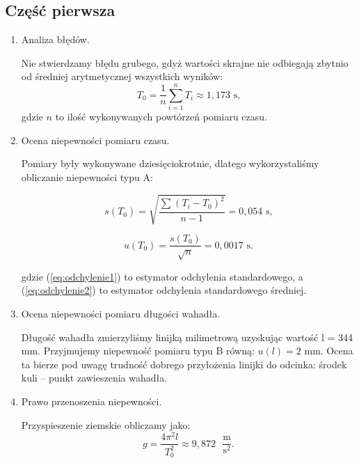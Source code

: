 \documentclass [a4paper,11pt]{article}
\begin{document}
	\subsection{Część pierwsza}\label{cz1}
	\begin{enumerate}[label=\alph*)]
		\item Analiza błędów.
		
		Nie stwierdzamy błędu grubego, gdyż wartości skrajne nie odbiegają zbytnio od średniej arytmetycznej wszystkich wyników:
		\begin{equation}
		\label{eq:srednia}
			T_{\text{0}}  = \frac{1}{n} \sum_{i=1}^{n} T_i \approx 1,173\text{ s,}
		\end{equation}
		gdzie $n$ to ilość wykonywanych powtórzeń pomiaru czasu.
		
		\item Ocena niepewności pomiaru czasu.
		
		Pomiary były wykonywane dziesięciokrotnie, dlatego wykorzystaliśmy obliczanie niepewności typu A:
		
		\begin{equation}
		\label{eq:odchylenie1}
			s(T_0) = \sqrt{\frac{\sum_{}^{}(T_i-T_0)^2}{n - 1}} = 0,054\text{ s,}
		\end{equation}
		
		\begin{equation}
		\label{eq:odchylenie2}
			u(T_0) = \frac{s(T_0)}{\sqrt{n}} = 0,0017\text{ s.}
		\end{equation}
		
		gdzie (\ref{eq:odchylenie1}) to estymator odchylenia standardowego, a (\ref{eq:odchylenie2}) to estymator odchylenia standardowego średniej.
		
		\item Ocena niepewności pomiaru długości wahadła.
			
			Długość wahadła zmierzyliśmy linijką milimetrową uzyskując wartość l = 344 mm. Przyjmujemy niepewność pomiaru typu B równą: $u(l) = 2 \text{ mm}$. Ocena ta bierze pod uwagę trudność dobrego przyłożenia linijki do odcinka: środek kuli – punkt zawieszenia wahadła.

		
		\item Prawo przenoszenia niepewności.
		
		Przyspieszenie ziemskie obliczamy jako:
		\begin{equation}
		\label{eq:przyspieszenie}
			g=\frac{4\pi^2l}{T_0^2} \approx 9,872 \text{ }\mathrm{\frac{m}{s^2}.}
		\end{equation}
		

\end{enumerate}
\end{document}
